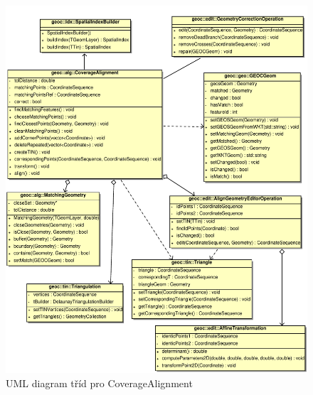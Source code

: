 \vspace{2cm}
  \begin{figure}[t]
    \centering
      \includegraphics[width=420pt]{./pictures/uml-ca.pdf}
      \caption{UML diagram tříd pro CoverageAlignment}
      \label{fig:uml-ca}
  \end{figure}

